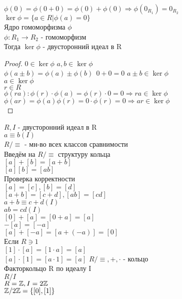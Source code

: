 $ \phi(0) = \phi(0+0) = \phi(0) + \phi(0) \Rightarrow \phi(0_{R_1}) = 0_{R_2} $\\
$ \ker \phi = \{ a \in R | \phi(a) = 0 \} $\\
Ядро гомоморфизма $ \phi $ \\
$  \phi : R_1 \rightarrow R_2 $ - гомоморфизм \\
Тогда $ \ker \phi $ - двусторонний идеал в R \\
\begin{proof}
	$ 0 \in \ker \phi $
	$ a, b \in \ker \phi $ \\
	$ \phi (a \pm b) = \phi(a) \pm \phi(b) \ \ 0+0=0$
	$ a \pm b \in  \ker \phi $\\
	$ a \in \ker \phi $ \\
	$ r \in R$ \\
	$ \phi(ra) : \phi(r) \cdot \phi(a) = \phi(r) \cdot 0 = 0 \Rightarrow ra \in \ker \phi $\\
	$ \phi (ar) = \phi(a) \phi(r) = 0 \cdot \phi(r) = 0 \Rightarrow ar \in \ker \phi $\\ 
\end{proof}


$ R, I $ - двусторонний идеал в R \\
$ a \equiv b (I) $\\
$ R / \equiv $ - мн-во всех классов сравнимости \\
Введём на $ R/\equiv $ структуру кольца \\
$ [a] + [b] = [a+b] $\\
$ [a][b] = [ab] $\\
Проверка корректности \\
$ [a] = [c], [b] = [d] $ \\
$ [a+b] = [c+d], [ab] = [cd] $\\
$ a+b \equiv c+d(I) $\\
$ ab = cd (I) $\\
$ [0] + [a] = [0+a] = [a] $ \\
$ -[a] = [-a] $ \\
$ [a] + [-a] = [a + (-a)] = [0] $ \\
Если $ R \ni 1 $ \\
$ [1] \cdot [a] = [1 \cdot a ] = [a] $ \\
$ [a] \cdot [1] = [a \cdot 1] = [a] $  
$ R / \equiv, +, \cdot  $ - кольцо \\
Факторкольцо R по идеалу I \\
$ R / I $ \\
$ R = \mathbb{Z} , I = 2\mathbb{Z} $ \\
$ \mathbb{Z} / 2\mathbb{Z} = \{ [0], [1] \} $ \\

